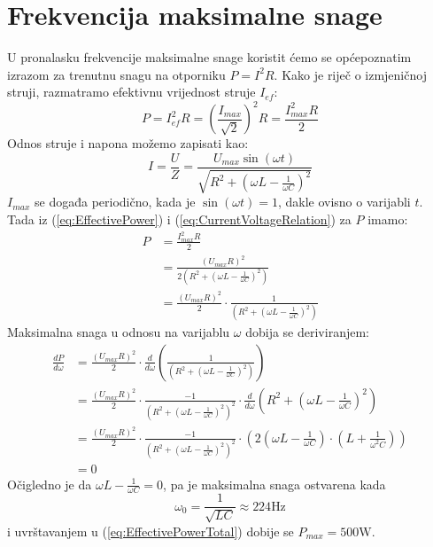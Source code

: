 \documentclass{article}
\let\oldref\ref
\renewcommand{\ref}[1]{(\oldref{#1})}
\begin{document}
\section*{Frekvencija maksimalne snage}
U pronalasku frekvencije maksimalne snage koristit ćemo se općepoznatim izrazom za trenutnu snagu na otporniku $P = I^2R$. Kako je riječ o izmjeničnoj struji, razmatramo efektivnu vrijednost struje $I_{ef}$:
\begin{equation}
  \label{eq:EffectivePower}
  P = I_{ef}^2R = \left(\frac{I_{max}}{\sqrt{2}}\right)^2R = \frac{I_{max}^2R}{2}
\end{equation}
Odnos struje i napona možemo zapisati kao:
\begin{equation}
  \label{eq:CurrentVoltageRelation}
  I = \frac{U}{Z} = \frac{U_{max}\sin(\omega t)}{\sqrt{R^2 + (\omega L - \frac{1}{\omega C})^2}}
\end{equation}
$I_{max}$ se događa periodično, kada je $\sin(\omega t) = 1$, dakle ovisno o varijabli $t$.\\Tada iz \ref{eq:EffectivePower} i \ref{eq:CurrentVoltageRelation} za $P$ imamo:
\begin{align}
  P & = \frac{I_{max}^2R}{2}                                                                                   \\
    & = \frac{\left(U_{max}R\right)^2}{2\left(R^2 + (\omega L - \frac{1}{\omega C})^2\right)}                  \\
  \label{eq:EffectivePowerTotal}
    & = \frac{\left(U_{max}R\right)^2}{2} \cdot \frac{1}{\left(R^2 + (\omega L - \frac{1}{\omega C})^2\right)}
\end{align}
Maksimalna snaga u odnosu na varijablu $\omega$ dobija se deriviranjem:
\begin{align}
  \frac{dP}{d\omega} & = \frac{\left(U_{max}R\right)^2}{2} \cdot \frac{d}{d\omega}\left(\frac{1}{\left(R^2 + (\omega L - \frac{1}{\omega C})^2\right)}\right)                                                          \\
                     & = \frac{\left(U_{max}R\right)^2}{2} \cdot \frac{-1}{\left(R^2 + (\omega L - \frac{1}{\omega C})^2\right)^2} \cdot \frac{d}{d\omega}\left(R^2 + (\omega L - \frac{1}{\omega C})^2\right)         \\
                     & = \frac{\left(U_{max}R\right)^2}{2} \cdot \frac{-1}{\left(R^2 + (\omega L - \frac{1}{\omega C})^2\right)^2} \cdot \left(2(\omega L - \frac{1}{\omega C})\cdot (L + \frac{1}{\omega^2C}) \right) \\
                     & = 0
\end{align}
Očigledno je da $\omega L - \frac{1}{\omega C} = 0$, pa je maksimalna snaga ostvarena kada
\begin{equation}
  \omega_0 = \frac{1}{\sqrt{LC}} \approx 224\text{Hz}
\end{equation}
i uvrštavanjem u \ref{eq:EffectivePowerTotal} dobije se $P_{max} = 500\text{W}$.
\newpage
\end{document}
